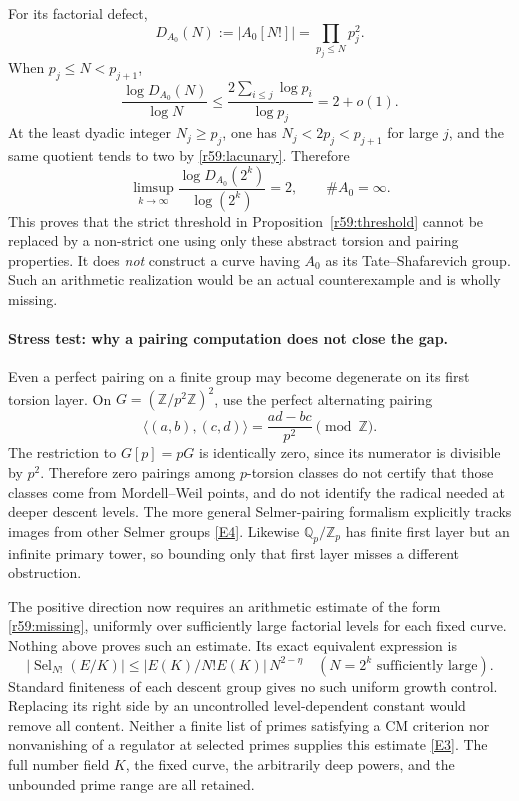 \documentclass[11pt,a4paper]{article}
\newcommand{\Z}{\mathbb{Z}}
\newcommand{\Q}{\mathbb{Q}}
\newcommand{\eref}[2]{\hyperlink{extra:#1:#2}{[E#2]}}
\numberwithin{equation}{section}
\begin{document}
For its factorial defect,
\begin{equation}\label{r59:toydefect}
 D_{A_0}(N):=|A_0[N!]|=\prod_{p_j\leq N}p_j^2.
\end{equation}
When $p_j\leq N<p_{j+1}$,
\[
 \frac{\log D_{A_0}(N)}{\log N}
 \leq\frac{2\sum_{i\leq j}\log p_i}{\log p_j}=2+o(1).
\]
At the least dyadic integer $N_j\geq p_j$, one has $N_j<2p_j<p_{j+1}$ for large $j$, and the same quotient tends to two by \eqref{r59:lacunary}. Therefore
\begin{equation}\label{r59:sharp}
 \limsup_{k\to\infty}\frac{\log D_{A_0}(2^k)}{\log(2^k)}=2,
 \qquad \#A_0=\infty.
\end{equation}
This proves that the strict threshold in Proposition~\ref{r59:threshold} cannot be replaced by a non-strict one using only these abstract torsion and pairing properties. It does \emph{not} construct a curve having $A_0$ as its Tate--Shafarevich group. Such an arithmetic realization would be an actual counterexample and is wholly missing.

\paragraph{Stress test: why a pairing computation does not close the gap.}
Even a perfect pairing on a finite group may become degenerate on its first torsion layer. On $G=(\Z/p^2\Z)^2$, use the perfect alternating pairing
\[
 \langle(a,b),(c,d)\rangle=\frac{ad-bc}{p^2}\pmod\Z.
\]
The restriction to $G[p]=pG$ is identically zero, since its numerator is divisible by $p^2$. Therefore zero pairings among $p$-torsion classes do not certify that those classes come from Mordell--Weil points, and do not identify the radical needed at deeper descent levels. The more general Selmer-pairing formalism explicitly tracks images from other Selmer groups \eref{59}{4}. Likewise $\Q_p/\Z_p$ has finite first layer but an infinite primary tower, so bounding only that first layer misses a different obstruction.

The positive direction now requires an arithmetic estimate of the form \eqref{r59:missing}, uniformly over sufficiently large factorial levels for each fixed curve. Nothing above proves such an estimate. Its exact equivalent expression is
\[
 |\operatorname{Sel}_{N!}(E/K)|
       \leq |E(K)/N!E(K)|\,N^{2-\eta}
                 \quad(N=2^k\text{ sufficiently large}).
\]
Standard finiteness of each descent group gives no such uniform growth control. Replacing its right side by an uncontrolled level-dependent constant would remove all content. Neither a finite list of primes satisfying a CM criterion nor nonvanishing of a regulator at selected primes supplies this estimate \eref{59}{3}. The full number field $K$, the fixed curve, the arbitrarily deep powers, and the unbounded prime range are all retained.
\end{document}
